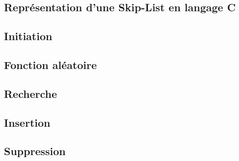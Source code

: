 \documentclass[hidelinks,a4paper, 12pt]{article}
\begin{document}
	\newpage
	\begin{appendices}
	\section{Représentation d'une Skip-List en langage C}
	\subsection{Initiation}\label{SKInit}
	
	\subsection{Fonction aléatoire}\label{SKRandom}
	

	\subsection{Recherche}\label{SKSearch}
	

	\subsection{Insertion}\label{SKInsert}
	
	
	\subsection{Suppression}\label{SKDelete}
	
	\newpage
	\end{appendices}
	
	
	
	
	\nocite{*}
	
	
	
	
	
\end{document}
